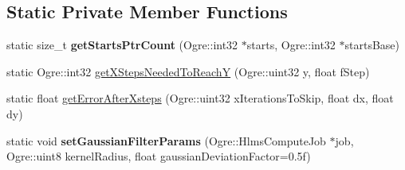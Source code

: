 \subsection*{Static Private Member Functions}
\begin{DoxyCompactItemize}
\item 
\mbox{\label{class_shadow_mapper_a54d854ea5525ec6cffaf5958d1d4077a}} 
static size\+\_\+t {\bfseries get\+Starts\+Ptr\+Count} (Ogre\+::int32 $\ast$starts, Ogre\+::int32 $\ast$starts\+Base)
\item 
static Ogre\+::int32 \hyperlink{class_shadow_mapper_a35a0aa58c648464248c2a9060f522921}{get\+X\+Steps\+Needed\+To\+ReachY} (Ogre\+::uint32 y, float f\+Step)
\item 
static float \hyperlink{class_shadow_mapper_ae95d31a0216503b8838738e959e32b1c}{get\+Error\+After\+Xsteps} (Ogre\+::uint32 x\+Iterations\+To\+Skip, float dx, float dy)
\item 
\mbox{\label{class_shadow_mapper_a1b07d0963a08cede75e24c8a99c5f52f}} 
static void {\bfseries set\+Gaussian\+Filter\+Params} (Ogre\+::\+Hlms\+Compute\+Job $\ast$job, Ogre\+::uint8 kernel\+Radius, float gaussian\+Deviation\+Factor=0.\+5f)
\end{DoxyCompactItemize}
